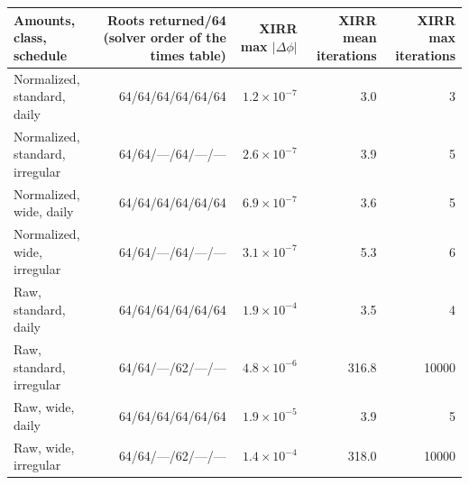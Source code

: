\begin{tabular}{lrrrr}
\toprule
Amounts, class, schedule & Roots returned/64 (solver order of the times table) & XIRR max $|\Delta\phi|$ & XIRR mean iterations & XIRR max iterations \\
\midrule
Normalized, standard, daily & 64/64/64/64/64/64 & $1.2\times10^{-7}$ & 3.0 & 3 \\
Normalized, standard, irregular & 64/64/---/64/---/--- & $2.6\times10^{-7}$ & 3.9 & 5 \\
Normalized, wide, daily & 64/64/64/64/64/64 & $6.9\times10^{-7}$ & 3.6 & 5 \\
Normalized, wide, irregular & 64/64/---/64/---/--- & $3.1\times10^{-7}$ & 5.3 & 6 \\
Raw, standard, daily & 64/64/64/64/64/64 & $1.9\times10^{-4}$ & 3.5 & 4 \\
Raw, standard, irregular & 64/64/---/62/---/--- & $4.8\times10^{-6}$ & 316.8 & 10000 \\
Raw, wide, daily & 64/64/64/64/64/64 & $1.9\times10^{-5}$ & 3.9 & 5 \\
Raw, wide, irregular & 64/64/---/62/---/--- & $1.4\times10^{-4}$ & 318.0 & 10000 \\
\bottomrule
\end{tabular}
